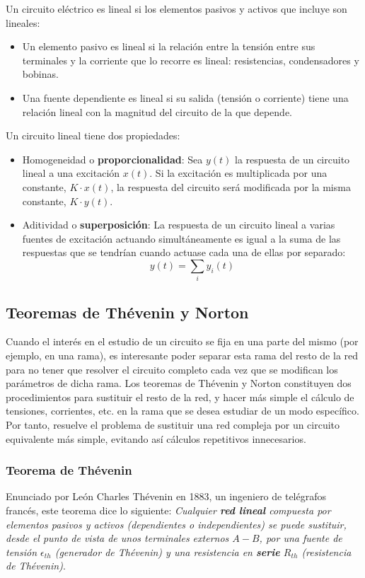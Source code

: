 	Un circuito eléctrico es lineal si los elementos pasivos y activos que incluye son lineales:
	\begin{itemize}
	    \item Un elemento pasivo es lineal si la relación entre la tensión entre sus terminales y la corriente que lo recorre es lineal: resistencias, condensadores y bobinas.
        \item Una fuente dependiente es lineal si su salida (tensión o corriente) tiene una relación
lineal con la magnitud del circuito de la que depende.
	\end{itemize}
Un circuito lineal tiene dos propiedades:
\begin{itemize}
    \item Homogeneidad o \textbf{proporcionalidad}: Sea $y(t)$ la respuesta de un circuito lineal a una excitación $x(t)$. Si la excitación es multiplicada por una constante, $K\cdot x(t)$, la respuesta del circuito será modificada por la misma constante, $K \cdot y(t)$.
    \item Aditividad o \textbf{superposición}: La respuesta de un circuito lineal a varias fuentes de excitación actuando simultáneamente es igual a la suma de las respuestas que se tendrían cuando actuase cada una de ellas por separado:
    \begin{equation*}
        y(t)=\sum_i y_i(t)
    \end{equation*}
\end{itemize}

	
	\subsection{Teoremas de Thévenin y Norton}
Cuando el interés en el estudio de un circuito se fija en una parte del mismo (por ejemplo, en una rama), es interesante poder separar esta rama del resto de la red para no tener que resolver el circuito completo cada vez que se modifican los parámetros de dicha rama.  Los teoremas de Thévenin y Norton constituyen dos procedimientos para sustituir el resto de la red, y hacer más simple el cálculo de tensiones, corrientes, etc. en la rama que se desea estudiar de un modo específico. Por tanto, resuelve el problema de sustituir una red compleja por un circuito equivalente más simple, evitando así cálculos repetitivos innecesarios. 

\subsubsection{Teorema de Thévenin}
Enunciado por León Charles Thévenin en 1883, un ingeniero de telégrafos francés, este teorema dice lo siguiente:  \textit{Cualquier \textbf{red lineal} compuesta por elementos pasivos y activos (dependientes o independientes) se puede sustituir, desde el punto de vista de unos terminales externos $A-B$, por una fuente de tensión $\epsilon_{th}$ (generador de Thévenin) y una resistencia en \textbf{serie} $R_{th}$ (resistencia de Thévenin)}. 
    

